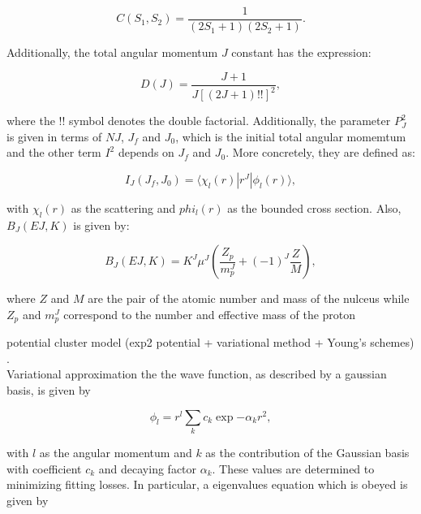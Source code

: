 \documentclass[openany]{book}
\begin{document}
\begin{equation}\label{eq:potential_radiativeCrossSections_spinConstant}
	C(S_1, S_2) = \frac{1}{(2S_1 + 1)(2S_2 + 1)}.
\end{equation}

Additionally, the total angular momentum $J$ constant has the expression:

\begin{equation}\label{eq:potential_radiativeCrossSections_JConstant}
	D(J) = \frac{J+1}{J[(2J + 1)!!]^2},
\end{equation}

where the !! symbol denotes the double factorial. Additionally, the parameter $P^2_{J}$ is given in terms of $NJ$, $J_f$ and $J_0$, which is the initial total angular momemtum and the other term $I^2$ depends on $J_f$ and $J_0$. More concretely, they are defined as:

\begin{equation}\label{eq:potential_radiativeCrossSections_Iintegral}
	I_J(J_f, J_0) = 	\langle\chi_l(r) | r^J| \phi_l(r) \rangle,
\end{equation}

with $\chi_l(r) $ as the scattering and $phi_l(r) $ as the bounded cross section. Also, $B_J(EJ, K)$ is given by:

\begin{equation}\label{eq:potential_radiativeCrossSections_Bj}
	B_J(EJ, K) = K^J \mu^J \left( \frac{Z_p}{m^J_p} + (-1)^{J} \frac{Z}{M}\right),
\end{equation}

where $Z$ and $M$ are the pair of the atomic number and mass of the nulceus while $Z_p$ and $m^J_p$ correspond to the number and effective mass of the proton



potential cluster model (exp2 potential + variational method + Young's schemes)
\cite{dubovichenko_2012}. \\

Variational approximation the the wave function, as described by a gaussian basis, is given by

\begin{equation}\label{eq:potential_variational_basis}
	\phi_l = r^l \sum_{k}  c_k \exp{-\alpha_k r^2},
 \end{equation}

with $l$ as the angular momentum and $k$ as the contribution of the Gaussian basis with coefficient $c_k$ and decaying factor $\alpha_k$. These values are determined to minimizing fitting losses. In particular, a eigenvalues equation which is obeyed is given by
\end{document}
